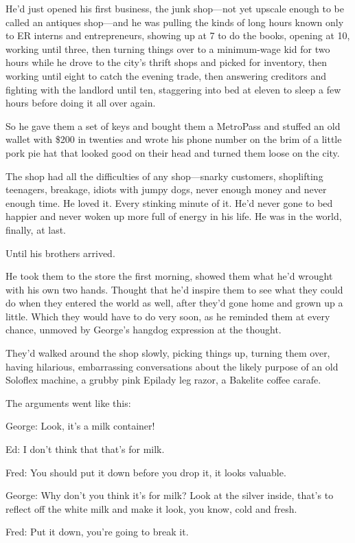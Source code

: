 \documentclass{article}
\begin{document}
He'd just opened his first business, the junk shop---not yet upscale
enough to be called an antiques shop---and he was pulling the kinds of
long hours known only to ER interns and entrepreneurs, showing up at 7
to do the books, opening at 10, working until three, then turning
things over to a minimum-wage kid for two hours while he drove to the
city's thrift shops and picked for inventory, then working until eight
to catch the evening trade, then answering creditors and fighting with
the landlord until ten, staggering into bed at eleven to sleep a few
hours before doing it all over again.

So he gave them a set of keys and bought them a MetroPass and stuffed
an old wallet with \$200 in twenties and wrote his phone number on the
brim of a little pork pie hat that looked good on their head and
turned them loose on the city.

The shop had all the difficulties of any shop---snarky customers,
shoplifting teenagers, breakage, idiots with jumpy dogs, never enough
money and never enough time.  He loved it.  Every stinking minute of
it.  He'd never gone to bed happier and never woken up more full of
energy in his life.  He was in the world, finally, at last.

Until his brothers arrived.

He took them to the store the first morning, showed them what he'd
wrought with his own two hands.  Thought that he'd inspire them to see
what they could do when they entered the world as well, after they'd
gone home and grown up a little.  Which they would have to do very
soon, as he reminded them at every chance, unmoved by George's hangdog
expression at the thought.

They'd walked around the shop slowly, picking things up, turning them
over, having hilarious, embarrassing conversations about the likely
purpose of an old Soloflex machine, a grubby pink Epilady leg razor, a
Bakelite coffee carafe.

The arguments went like this:

George:  Look, it's a milk container!

Ed:  I don't think that that's for milk.

Fred:  You should put it down before you drop it, it looks valuable.

George:  Why don't you think it's for milk?  Look at the silver
inside, that's to reflect off the white milk and make it look, you
know, cold and fresh.

Fred:  Put it down, you're going to break it.
\end{document}
